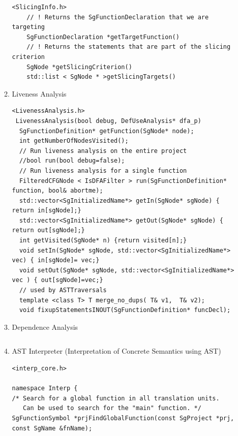 \begin{enumerate}
\begin{enumerate}
\begin{lstlisting}
<SlicingInfo.h>
    // ! Returns the SgFunctionDeclaration that we are targeting
    SgFunctionDeclaration *getTargetFunction()
    // ! Returns the statements that are part of the slicing criterion
    SgNode *getSlicingCriterion()
    std::list < SgNode * >getSlicingTargets()

      \end{lstlisting}


      \item Liveness Analysis
      \begin{lstlisting}
<LivenessAnalysis.h>
 LivenessAnalysis(bool debug, DefUseAnalysis* dfa_p)
  SgFunctionDefinition* getFunction(SgNode* node);
  int getNumberOfNodesVisited();
  // Run liveness analysis on the entire project
  //bool run(bool debug=false);
  // Run liveness analysis for a single function
  FilteredCFGNode < IsDFAFilter > run(SgFunctionDefinition* function, bool& abortme);
  std::vector<SgInitializedName*> getIn(SgNode* sgNode) { return in[sgNode];}
  std::vector<SgInitializedName*> getOut(SgNode* sgNode) { return out[sgNode];}
  int getVisited(SgNode* n) {return visited[n];}
  void setIn(SgNode* sgNode, std::vector<SgInitializedName*> vec) { in[sgNode]= vec;}
  void setOut(SgNode* sgNode, std::vector<SgInitializedName*> vec ) { out[sgNode]=vec;}
  // used by ASTTraversals
  template <class T> T merge_no_dups( T& v1,  T& v2);
  void fixupStatementsINOUT(SgFunctionDefinition* funcDecl);

      \end{lstlisting}

      \item Dependence Analysis
      \begin{lstlisting}

      \end{lstlisting}


      \item AST Interpreter (Interpretation of Concrete Semantics using AST)
\begin{lstlisting}
<interp_core.h>

namespace Interp {
/* Search for a global function in all translation units.
   Can be used to search for the "main" function. */
SgFunctionSymbol *prjFindGlobalFunction(const SgProject *prj, const SgName &fnName);


\end{lstlisting}
\end{enumerate}
\end{enumerate}
